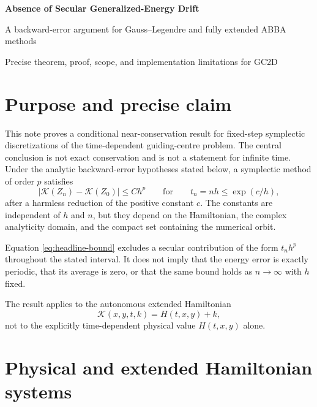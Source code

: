 \documentclass[11pt,a4paper]{article}
\theoremstyle{definition}
\theoremstyle{remark}
\newcommand{\K}{\mathcal{K}}
\newcommand{\abs}[1]{\left\lvert #1\right\rvert}
\begin{document}
\begin{center}
  {\LARGE\bfseries\color{blue}Absence of Secular Generalized-Energy Drift}\par
  \vspace{0.35em}
  {\large A backward-error argument for Gauss--Legendre and fully extended ABBA methods}\par
  \vspace{0.45em}
  {\small Precise theorem, proof, scope, and implementation limitations for GC2D}
\end{center}

\vspace{0.5em}

\section{Purpose and precise claim}

This note proves a conditional near-conservation result for fixed-step
symplectic discretizations of the time-dependent guiding-centre problem.  The
central conclusion is not exact conservation and is not a statement for
infinite time.  Under the analytic backward-error hypotheses stated below, a
symplectic method of order $p$ satisfies
\begin{equation}
 \abs{\K(Z_n)-\K(Z_0)}\leq C h^p
 \qquad\text{for}\qquad
 t_n=nh\leq \exp(c/h),
 \label{eq:headline-bound}
\end{equation}
after a harmless reduction of the positive constant $c$.  The constants are
independent of $h$ and $n$, but they depend on the Hamiltonian, the complex
analyticity domain, and the compact set containing the numerical orbit.

Equation \eqref{eq:headline-bound} excludes a secular contribution of the
form $t_nh^p$ throughout the stated interval.  It does not imply that the
energy error is exactly periodic, that its average is zero, or that the same
bound holds as $n\to\infty$ with $h$ fixed.

The result applies to the autonomous extended Hamiltonian
\begin{equation}
 \K(x,y,t,k)=H(t,x,y)+k,
 \label{eq:extended-hamiltonian-introduction}
\end{equation}
not to the explicitly time-dependent physical value $H(t,x,y)$ alone.

\section{Physical and extended Hamiltonian systems}
\end{document}
